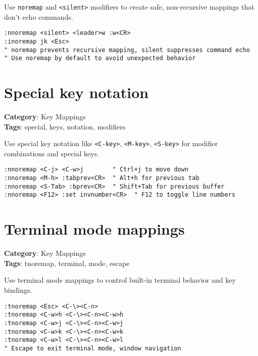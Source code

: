 Use {\footnotesize \Verb§noremap§} and {\footnotesize \Verb§<silent>§} modifiers to create safe, non-recursive mappings that don't echo commands.

\begin{Exa*}{}
\begin{Verbatim}[fontsize=\footnotesize, breaklines, breakanywhere]
:nnoremap <silent> <leader>w :w<CR>
:inoremap jk <Esc>
" noremap prevents recursive mapping, silent suppresses command echo
" Use noremap by default to avoid unexpected behavior
\end{Verbatim}
\end{Exa*}

\section{Special key notation}

\textbf{Category}: Key Mappings\\ \textbf{Tags}: special, keys, notation, modifiers
\vspace{0.5cm}

Use special key notation like {\footnotesize \Verb§<C-key>§}, {\footnotesize \Verb§<M-key>§}, {\footnotesize \Verb§<S-key>§} for modifier combinations and special keys.

\begin{Exa*}{}
\begin{Verbatim}[fontsize=\footnotesize, breaklines, breakanywhere]
:nnoremap <C-j> <C-w>j        " Ctrl+j to move down
:nnoremap <M-h> :tabprev<CR>  " Alt+h for previous tab
:nnoremap <S-Tab> :bprev<CR>  " Shift+Tab for previous buffer
:nnoremap <F12> :set invnumber<CR>  " F12 to toggle line numbers
\end{Verbatim}
\end{Exa*}

\section{Terminal mode mappings}

\textbf{Category}: Key Mappings\\ \textbf{Tags}: tnoremap, terminal, mode, escape
\vspace{0.5cm}

Use terminal mode mappings to control built-in terminal behavior and key bindings.

\begin{Exa*}{}
\begin{Verbatim}[fontsize=\footnotesize, breaklines, breakanywhere]
:tnoremap <Esc> <C-\><C-n>
:tnoremap <C-w>h <C-\><C-n><C-w>h
:tnoremap <C-w>j <C-\><C-n><C-w>j
:tnoremap <C-w>k <C-\><C-n><C-w>k
:tnoremap <C-w>l <C-\><C-n><C-w>l
" Escape to exit terminal mode, window navigation
\end{Verbatim}
\end{Exa*}

